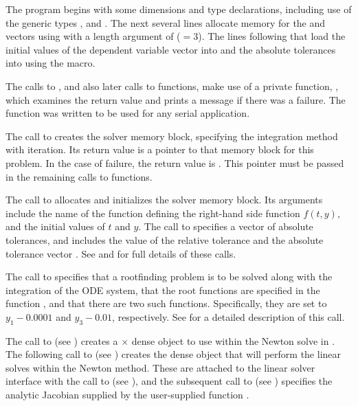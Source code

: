 The  program begins with some dimensions and type declarations,
including use of the generic types ,  and
.  The next several lines 
allocate memory for the  and  vectors using
 with a length argument of  ($= 3$). The
lines following that load the initial values of the dependent
variable vector into  and the absolute tolerances into 
using the  macro.

The calls to , and also later calls to 
functions, make use of a private function, , which examines
the return value and prints a message if there was a failure.  The
 function was written to be used for any serial {\sundials}
application.

The call to  creates the {\cvode} solver memory block,
specifying the  integration method with  iteration.
Its return value is a pointer to that memory block for this
problem.  In the case of failure, the return value is .  This
pointer must be passed in the remaining calls to {\cvode} functions.

The call to  allocates and initializes the solver memory block.
Its arguments include the name of the {\CC} function  defining the
right-hand side function $f(t,y)$, and the initial values of $t$ and $y$.
The call to  specifies a vector of absolute tolerances,
and includes the value of the relative tolerance  and the absolute 
tolerance vector .  See  and
 for full details of these calls.

The call to  specifies that a rootfinding problem
is to be solved along with the integration of the ODE system, that the
root functions are specified in the function , and that there are
two such functions.  Specifically, they are set to $y_1 - 0.0001$ and 
$y_3 - 0.01$, respectively.
See  for a detailed description of this call.

The call to  (see ) creates
a $\times$ dense {\sunmatrix} object to use within the
Newton solve in {\cvode}.  The following call to
 (see ) creates the 
dense {\sunlinsol} object that will perform the linear solves within
the Newton method.  These are attached to the {\cvls} linear
solver interface with the  call to  (see
), and the subsequent call to
 (see ) specifies the
analytic Jacobian supplied by the user-supplied function .

